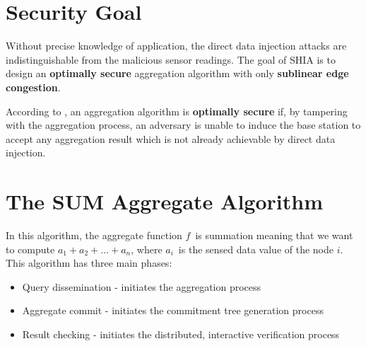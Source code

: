 	\section{Security Goal}
	Without precise knowledge of application, the direct data injection attacks are indistinguishable from the malicious sensor readings.
	The goal of SHIA is to design an \textbf{optimally secure} aggregation algorithm with only \textbf{sublinear edge congestion}.
	\begin{definition}
		\label{def:optimally-secure}
		According to \cite{chan2006secure}, an aggregation algorithm is \textbf{optimally secure} if, by tampering with the aggregation process, an adversary is unable to induce the base station to accept any aggregation result which is not already achievable by direct data injection.
	\end{definition}

	\section{The SUM Aggregate Algorithm}
		In this algorithm, the aggregate function $f$\ is summation meaning that we want to compute $a_{1} + a_{2} + \dotsc + a_{n}$, where $a_{i}$\ is the sensed data value of the node $i$.
		This algorithm has three main phases:
		\begin{itemize}
			\item Query dissemination - initiates the aggregation process
			\item Aggregate commit - initiates the commitment tree generation process
			\item Result checking - initiates the distributed, interactive verification process
		\end{itemize}


